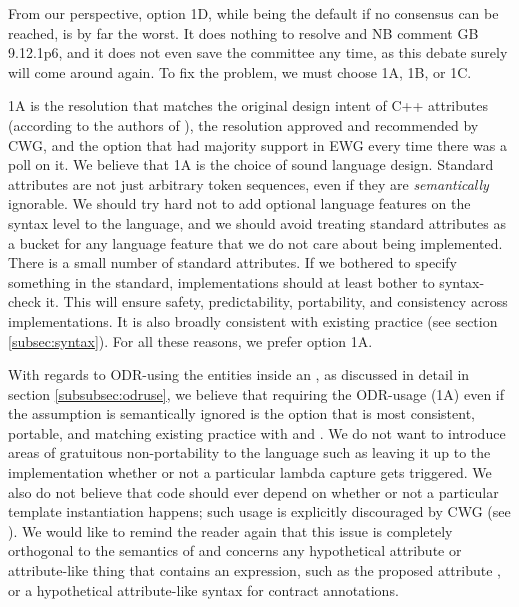 From our perspective, option 1D, while being the default if no consensus can be reached, is by far the worst. It does nothing to resolve \cite{CWG2538} and NB comment GB 9.12.1p6, and it does not even save the committee any time, as this debate surely will come around again. To fix the problem, we must choose 1A, 1B, or 1C.

1A is the resolution that matches the original design intent of C++ attributes (according to the authors of \cite{N2761}), the resolution approved and recommended by CWG, and the option that had majority support in EWG every time there was a poll on it. We believe that 1A is the choice of sound language design. Standard attributes are not just arbitrary token sequences, even if they are \emph{semantically} ignorable. We should try hard not to add optional language features on the syntax level to the language, and we should avoid treating standard attributes as a bucket for any language feature that we do not care about being implemented. There is a small number of standard attributes. If we bothered to specify something in the
standard, implementations should at least bother to syntax-check it. This will ensure safety, predictability, portability, and consistency across implementations. It is also broadly consistent with existing practice (see section \ref{subsec:syntax}). For all these reasons, we prefer option 1A.

With regards to ODR-using the entities inside an , as discussed in detail in section \ref{subsubsec:odruse}, we believe that requiring the ODR-usage (1A) even if the assumption is semantically ignored is the option that is most consistent, portable, and matching existing practice with  and . We do not want to introduce areas of gratuitous non-portability to the language such as leaving it up to the implementation whether or not a particular lambda capture gets triggered. We also do not believe that code should ever depend on whether or not a particular template instantiation happens; such usage is explicitly discouraged by CWG (see \cite{CWG2118}). We would like to remind the reader again that this issue is completely orthogonal to the semantics of  and concerns any hypothetical attribute or attribute-like thing that contains an expression, such as the proposed  attribute \cite{P1144R5}, or a hypothetical attribute-like syntax for contract annotations.
 
